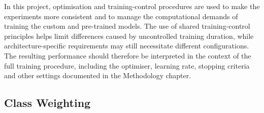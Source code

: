 \documentclass[12pt, a4paper]{report}
\let\oldsubsection\subsection
\renewcommand{\subsection}{%
    \Needspace{6\baselineskip}%
    \oldsubsection
}
\begin{document}
				In this project, optimisation and training-control procedures are used to make the experiments more consistent and to manage the computational demands of training the custom and pre-trained models. The use of shared training-control principles helps limit differences caused by uncontrolled training duration, while architecture-specific requirements may still necessitate different configurations. The resulting performance should therefore be interpreted in the context of the full training procedure, including the optimiser, learning rate, stopping criteria and other settings documented in the Methodology chapter.
				
			\subsection{Class Weighting}
				
\end{document}
